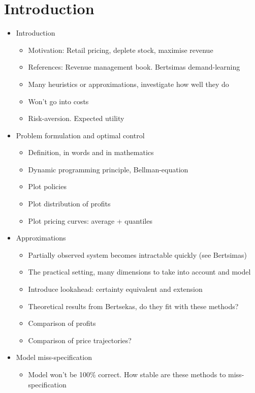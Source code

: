 \documentclass[main.tex]{subfiles}
\begin{document}
\listoftodos[Notes]

\section{Introduction}

\begin{itemize}
\item Introduction
  \begin{itemize}
  \item Motivation: Retail pricing, deplete stock, maximise revenue
  \item References: Revenue management book. Bertsimas demand-learning
  \item Many heuristics or approximations, investigate how well they
    do
  \item Won't go into costs
  \item Risk-aversion. Expected utility
  \end{itemize}
\item Problem formulation and optimal control
  \begin{itemize}
  \item Definition, in words and in mathematics
  \item Dynamic programming principle, Bellman-equation
  \item Plot policies
  \item Plot distribution of profits
  \item Plot pricing curves: average + quantiles
  \end{itemize}
\item Approximations
  \begin{itemize}
  \item Partially observed system becomes intractable
    quickly (see Bertsimas)
  \item The practical setting, many dimensions to take into account
    and model
  \item Introduce lookahead: certainty equivalent and extension
  \item Theoretical results from Bertsekas, do they fit with these methods?
  \item Comparison of profits
  \item Comparison of price trajectories?
  \end{itemize}
\item Model miss-specification
  \begin{itemize}
  \item Model won't be 100\% correct. How stable are these methods to miss-specification

\end{itemize}
\end{itemize}
\end{document}
